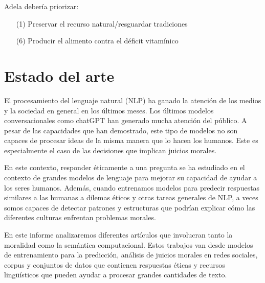 \documentclass[
	spanish, %
	letterpaper, oneside
]{article}
\begin{document}
Adela debería priorizar:
\begin{itemize}
    \item[(1)] Preservar el recurso natural/resguardar tradiciones
    \item[(6)] Producir el alimento contra el déficit vitamínico
\end{itemize}


\section{Estado del arte}

El procesamiento del lenguaje natural (NLP) ha ganado la atención de los medios y la sociedad en general en los últimos meses. Los últimos modelos conversacionales como chatGPT han generado mucha atención del público. A pesar de las capacidades que han demostrado, este tipo de modelos no son capaces de procesar ideas de la misma manera que lo hacen los humanos. Este es especialmente el caso de las decisiones que implican juicios morales.

\newp En este contexto, responder éticamente a una pregunta se ha estudiado en el contexto de grandes modelos de lenguaje para mejorar su capacidad de ayudar a los seres humanos. Además, cuando entrenamos modelos para predecir respuestas similares a las humanas a dilemas éticos y otras tareas generales de NLP, a veces somos capaces de detectar patrones y estructuras que podrían explicar cómo las diferentes culturas enfrentan problemas morales.

\newp En este informe analizaremos diferentes artículos que involucran tanto la moralidad como la semántica computacional. Estos trabajos van desde modelos de entrenamiento para la predicción, análisis de juicios morales en redes sociales, corpus y conjuntos de datos que contienen respuestas éticas y recursos lingüísticos que pueden ayudar a procesar grandes cantidades de texto.
\end{document}
